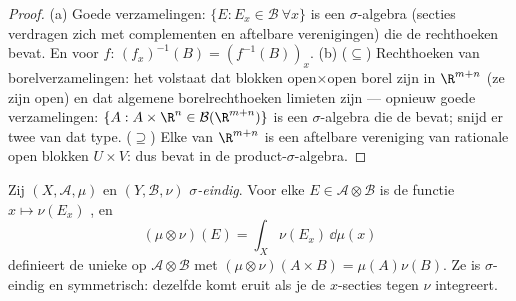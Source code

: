 \begin{proof}
(a) Goede verzamelingen: $\{E : E_x \in \mathcal B\ \forall x\}$
is een $\sigma$-algebra (secties verdragen zich met complementen
en aftelbare verenigingen) die de rechthoeken bevat. En voor $f$:
$(f_x)^{-1}(B) = (f^{-1}(B))_x$.
(b) ($\subseteq$) Rechthoeken van borelverzamelingen: het volstaat
dat blokken open$\times$open borel zijn in $\R^{m+n}$ (ze zijn
open) en dat algemene borelrechthoeken limieten zijn --- opnieuw
goede verzamelingen: $\{A : A\times\R^n \in \mathcal
B(\R^{m+n})\}$ is een $\sigma$-algebra die de 
bevat; snijd er twee van dat type. ($\supseteq$) Elke  van $\R^{m+n}$ is een aftelbare vereniging van
rationale open blokken $U\times V$: dus bevat in de
product-$\sigma$-algebra.
\end{proof}

\begin{theorem}[Productmaat]\label{thm:b3:product:existence}
Zij $(X, \mathcal A, \mu)$ en $(Y, \mathcal B, \nu)$
\emph{$\sigma$-eindig}. Voor elke $E \in \mathcal
A\otimes\mathcal B$ is de functie $x \mapsto \nu(E_x)$ ,
en
\[
(\mu\otimes\nu)(E) = \int_X \nu(E_x)\,\dd\mu(x)
\]
definieert de unieke  op $\mathcal A\otimes\mathcal B$ met
$(\mu\otimes\nu)(A\times B) = \mu(A)\nu(B)$. Ze is
$\sigma$-eindig en symmetrisch: dezelfde  komt eruit als je de
$x$-secties tegen $\nu$ integreert.
\end{theorem}

